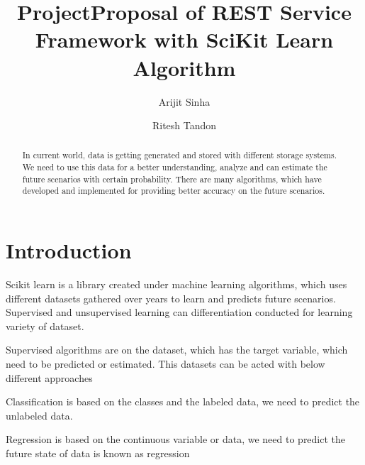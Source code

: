 
\title{ProjectProposal of REST Service Framework with SciKit Learn Algorithm}

\author{Arijit Sinha}

\author{Ritesh Tandon}

\renewcommand{\shortauthors}{G. v. Laszewski}


\begin{abstract}
In current world, data is getting generated and stored with different storage systems. 
We need to use this data for a better understanding, analyze and can estimate the 
future scenarios with certain probability. There are many algorithms, which have 
developed and implemented for providing better accuracy on the future scenarios.
\end{abstract}



\maketitle

\section{Introduction}

Scikit learn is a library created under machine learning algorithms, which uses 
different datasets gathered over years to learn and predicts future scenarios. 
Supervised and unsupervised learning can differentiation conducted for learning 
variety of dataset.

Supervised algorithms are on the dataset, which has the target variable, which 
need to be predicted or estimated. This datasets can be acted with below different 
approaches

Classification is based on the classes and the labeled data, we need to predict 
the unlabeled data.

Regression is based on the continuous variable or data, we need to predict the 
future state of data is known as regression

